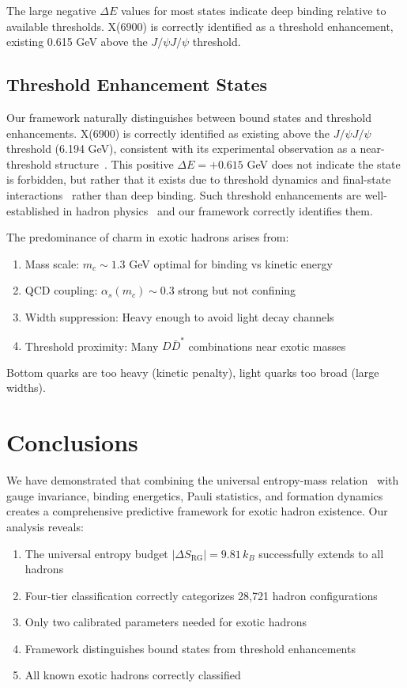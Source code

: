 \documentclass[12pt,a4paper]{article}
\begin{document}
The large negative $\Delta E$ values for most states indicate deep binding relative to available thresholds. X(6900) is correctly identified as a threshold enhancement, existing 0.615 GeV above the $J/\psi J/\psi$ threshold.

\subsection{Threshold Enhancement States}

Our framework naturally distinguishes between bound states and threshold enhancements. X(6900) is correctly identified as existing above the $J/\psi J/\psi$ threshold (6.194 GeV), consistent with its experimental observation as a near-threshold structure~\cite{LHCb2020}. This positive $\Delta E = +0.615$ GeV does not indicate the state is forbidden, but rather that it exists due to threshold dynamics and final-state interactions~\cite{Braaten2004} rather than deep binding. Such threshold enhancements are well-established in hadron physics~\cite{Guo2018} and our framework correctly identifies them.

The predominance of charm in exotic hadrons arises from:

\begin{enumerate}
\item Mass scale: $m_c \sim 1.3$ GeV optimal for binding vs kinetic energy
\item QCD coupling: $\alpha_s(m_c) \sim 0.3$ strong but not confining
\item Width suppression: Heavy enough to avoid light decay channels  
\item Threshold proximity: Many $D\bar{D}^*$ combinations near exotic masses
\end{enumerate}

Bottom quarks are too heavy (kinetic penalty), light quarks too broad (large widths).

\section{Conclusions}

We have demonstrated that combining the universal entropy-mass relation~\cite{Tupay2025} with gauge invariance, binding energetics, Pauli statistics, and formation dynamics creates a comprehensive predictive framework for exotic hadron existence. Our analysis reveals:

\begin{enumerate}
\item The universal entropy budget $|\Delta S_{\text{RG}}| = 9.81\,k_B$ successfully extends to all hadrons
\item Four-tier classification correctly categorizes 28,721 hadron configurations
\item Only two calibrated parameters needed for exotic hadrons
\item Framework distinguishes bound states from threshold enhancements
\item All known exotic hadrons correctly classified
\end{enumerate}
\end{document}
